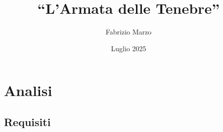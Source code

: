 \documentclass[a4paper,12pt]{report}
\title{``L'Armata delle Tenebre''}
\author{Fabrizio Marzo}
\date{Luglio 2025}
\begin{document}

\maketitle

\tableofcontents %

\chapter{Analisi} %


\section{Requisiti}
\end{document}
